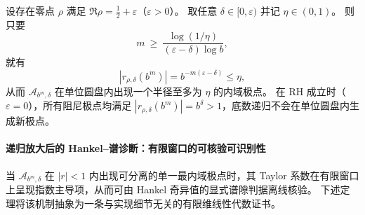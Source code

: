 \begin{corollary}[离线偏移在底数递归下的指数显影]\label{cor:abel-offcritical-exponential-radius-amplification}
设存在零点 \(\rho\) 满足 \(\Re\rho=\tfrac12+\varepsilon\)（\(\varepsilon>0\)）。
取任意 \(\delta\in[0,\varepsilon)\) 并记 \(\eta\in(0,1)\)。
则只要
\[
m\ \ge\ \frac{\log(1/\eta)}{(\varepsilon-\delta)\log b},
\]
就有
\[
|r_{\rho,\delta}(b^m)|=b^{-m(\varepsilon-\delta)}\le \eta,
\]
从而 \(\mathcal A_{b^m,\delta}\) 在单位圆盘内出现一个半径至多为 \(\eta\) 的内域极点。
在 RH 成立时（\(\varepsilon=0\)），所有阻尼极点均满足 \(|r_{\rho,\delta}(b^m)|=b^\delta>1\)，底数递归不会在单位圆盘内生成新极点。
\end{corollary}








\paragraph{递归放大后的 Hankel--谱诊断：有限窗口的可核验可识别性}
当 \(\mathcal A_{b^m,\delta}\) 在 \(|r|<1\) 内出现可分离的单一最内域极点时，其 Taylor 系数在有限窗口上呈现指数主导项，从而可由 Hankel 奇异值的显式谱隙判据离线核验。
下述定理将该机制抽象为一条与实现细节无关的有限维线性代数证书。

